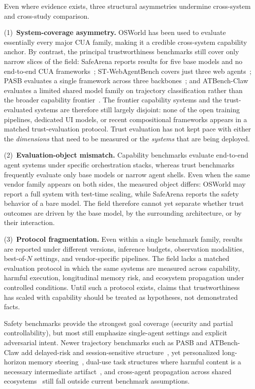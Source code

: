 Even where evidence exists, three structural asymmetries undermine cross-system and cross-study comparison.

(1)~\textbf{System-coverage asymmetry.} OSWorld has been used to evaluate essentially every major CUA family, making it a credible cross-system capability anchor. By contrast, the principal trustworthiness benchmarks still cover only narrow slices of the field: SafeArena reports results for five base models and no end-to-end CUA frameworks~\cite{safearena2025}; ST-WebAgentBench covers just three web agents~\cite{stwebagentbench2025}; PASB evaluates a single framework across three backbones~\cite{doubleagent2026}; and ATBench-Claw evaluates a limited shared model family on trajectory classification rather than the broader capability frontier~\cite{atbenchclaw2026}. The frontier capability systems and the trust-evaluated systems are therefore still largely disjoint: none of the open training pipelines, dedicated UI models, or recent compositional frameworks appears in a matched trust-evaluation protocol. Trust evaluation has not kept pace with either the \emph{dimensions} that need to be measured or the \emph{systems} that are being deployed.

(2)~\textbf{Evaluation-object mismatch.} Capability benchmarks evaluate end-to-end agent systems under specific orchestration stacks, whereas trust benchmarks frequently evaluate only base models or narrow agent shells. Even when the same vendor family appears on both sides, the measured object differs: OSWorld may report a full system with test-time scaling, while SafeArena reports the safety behavior of a bare model. The field therefore cannot yet separate whether trust outcomes are driven by the base model, by the surrounding architecture, or by their interaction.

(3)~\textbf{Protocol fragmentation.} Even within a single benchmark family, results are reported under different versions, inference budgets, observation modalities, best-of-$N$ settings, and vendor-specific pipelines. The field lacks a matched evaluation protocol in which the same systems are measured across capability, harmful execution, longitudinal memory risk, and ecosystem propagation under controlled conditions. Until such a protocol exists, claims that trustworthiness has scaled with capability should be treated as hypotheses, not demonstrated facts.

Safety benchmarks provide the strongest goal coverage (security and partial controllability), but most still emphasize single-agent settings and explicit adversarial intent. Newer trajectory benchmarks such as PASB and ATBench-Claw add delayed-risk and session-sensitive structure~\cite{doubleagent2026,atbenchclaw2026}, yet personalized long-horizon memory steering~\cite{storagetosteering2026}, dual-use task structures where harmful content is a necessary intermediate artifact~\cite{internalsafetycollapse2026}, and cross-agent propagation across shared ecosystems~\cite{clawworm2026} still fall outside current benchmark assumptions.

